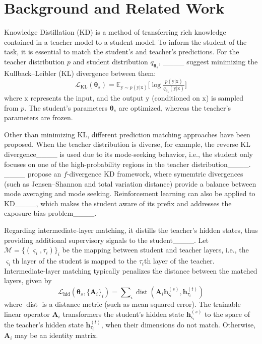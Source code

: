 \section{Background and Related Work}
Knowledge Distillation (KD) is a method of transferring rich knowledge contained in a teacher model to a student model. To inform the student of the task, it is essential to match the student's and teacher's predictions.  For the teacher distribution $p$ and student distribution $q_{\bm\theta_s}$, ____ suggest minimizing the Kullback--Leibler (KL) divergence between them: 
\begin{equation}
    \mathcal{L}_{\text{KL}}(\bm\theta_s) =  
    \mathbb{E}_{\mathrm y\sim p(\mathrm y| \mathrm x)}\big[
        \log{
            \tfrac{p(\mathrm y | \mathrm x)}
            {q_{\bm\theta_s}(\mathrm y | \mathrm x)}
        }
        \big]
\end{equation}
where $\mathrm x$ represents the input, and the output $\mathrm y$ (conditioned on $\mathrm x$) is sampled from $p$. The student's parameters $\bm\theta_s$ are optimized, whereas the teacher's parameters are frozen. 

Other than minimizing KL, different prediction matching approaches have been proposed.  When the teacher distribution is diverse, for example, the reverse KL divergence____ is used due to its mode-seeking behavior, i.e., the student only focuses on one of the high-probability regions in the teacher distribution____. ____ propose an $f$-divergence KD framework, where symemtric divergences (such as Jensen--Shannon and total variation distance) provide a balance between mode averaging and mode seeking. Reinforcement learning can also be applied to KD____, which makes the student aware of its prefix and addresses the exposure bias problem____.

Regarding intermediate-layer matching, it distills the teacher's hidden states, thus providing additional supervisory signals to the student____. Let $\mathcal M=\{(\varsigma_i, \tau_i)\}_{i}$ be the mapping between student and teacher layers, i.e., the $\varsigma_i$th layer of the student is mapped to the $\tau_i$th layer of the teacher. Intermediate-layer matching typically penalizes the distance between the matched layers, given by
\begin{equation}
    \mathcal L_{\text{hid}}( \bm\theta_s, \{\boldsymbol A_i\}_i) = \sum\nolimits_{i} \operatorname{dist}(\boldsymbol A_i \bm h_{\varsigma_i}^{(s)}, \boldsymbol h_{\tau_i}^{(t)}) 
\end{equation}
where $\operatorname{dist}$ is a distance metric (such as mean squared error). The trainable linear operator $\bm A_i$ transformers the student's hidden state $\bm h_{\varsigma_i}^{(s)}$ to the space of the teacher's hidden state $\boldsymbol h_{\tau_i}^{(t)}$, when their dimensions do not match. Otherwise, $\bm A_i$ may be an identity matrix.

